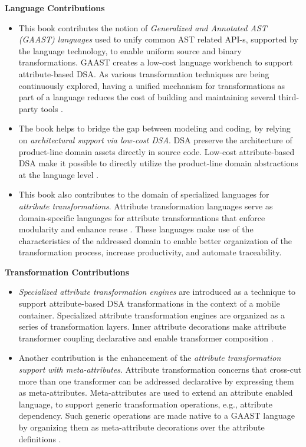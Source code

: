 \noindent \textbf{Language Contributions}
\begin{itemize}

\item This book contributes the notion of \textit{Generalized and Annotated AST (GAAST) languages} used to unify common AST related API-s, supported by the language technology, to enable uniform source and binary transformations. GAAST creates a low-cost language workbench \cite{lang.workbench} to support attribute-based DSA. As various transformation techniques are being continuously explored, having a unified mechanism for transformations as part of a language reduces the cost of building and maintaining several third-party tools .

\item The book helps to bridge the gap \cite{sf.04} between modeling and coding, by relying on \textit{architectural support via low-cost DSA}. DSA preserve the architecture of product-line domain assets directly in source code. Low-cost attribute-based DSA make it possible to directly utilize the product-line domain abstractions at the language level .

\item This book also contributes to the domain of specialized languages for \textit{attribute transformations}. Attribute transformation languages serve as domain-specific languages for attribute transformations that enforce modularity and enhance reuse . These languages make use of the characteristics of the addressed domain to enable better organization of the transformation process, increase productivity, and automate traceability. 
\end{itemize}

\noindent \textbf{Transformation Contributions}
\begin{itemize}
\item \textit{Specialized attribute transformation engines} are introduced as a technique to support attribute-based DSA transformations in the context of a mobile container. Specialized attribute transformation engines are organized as a series of transformation layers. Inner attribute decorations make attribute transformer coupling declarative and enable transformer composition .

\item Another contribution is the enhancement of the \textit{attribute transformation support with meta-attributes}. Attribute transformation concerns that cross-cut more than one transformer can be addressed declarative by expressing them as meta-attributes. Meta-attributes are used to extend an attribute enabled language, to support generic transformation operations, e.g., attribute dependency. Such generic operations are made native to a GAAST language by organizing them as meta-attribute decorations over the attribute definitions . %
\end{itemize}

